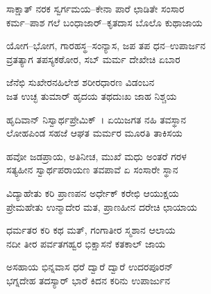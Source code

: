 
\begin{myquote}
ಸಾಕ್ಷಾತ್ ನರಕ ಸ್ವರ್ಗಮಯ–ಕೇನಾ ಪಾರೆ ಛಾಡಿತೇ ಸಂಸಾರ\\ಕರ್ಮ–ಪಾಶ ಗಲೆ ಬಂಧಾಜಾರ್–ಕೃತದಾಸ ಬೊಲೊ ಕುಥಾಜಾಯ
\end{myquote}


\begin{myquote}
ಯೋಗ–ಭೋಗ, ಗಾರಹಸ್ಥ–ಸಂನ್ಯಾಸ, ಜಪ ತಪ ಧನ–ಉಪಾರ್ಜನ\\ವ್ರತತ್ಯಾಗ ತಪಸ್ಯಕಠೋರ, ಸಬ್ ಮರ್ಮ ದೇಖೇಚಿ ಏಬಾರ
\end{myquote}


\begin{myquote}
ಜೆನೆಛಿ ಸುಖೇರನಹಿಲೇಶ ಶರೀರಧಾರಣ ವಿಡಂಬನ\\ಜತ ಉಚ್ಛ ತುಮಾರ್‌ ಹೃದಯ ತಥದುಃಖ ಜಾಹ ನಿಶ್ಚಯ
\end{myquote}


\begin{myquote}
ಹೃದಿವಾನ್ ನಿಸ್ವಾರ್ಥಪ್ರೇಮಿಕ್~। ಏಯಿಜಗತ ನಹಿ ತವಸ್ಥಾನ\\ಲೋಹಪಿಂಡ ಸಹಜೆ ಆಘತ ಮರ್ಮರ ಮೂರತಿ ತಾಕಿಸಯ
\end{myquote}


\begin{myquote}
ಹವೋ ಜಡಪ್ರಾಯ, ಅತಿನೀಚ, ಮುಖೆ ಮಧು ಅಂತರೆ ಗರಳ\\ಸತ್ಯಹೀನ ಸ್ವಾರ್ಥಪರಾಯಣ ತವಪಾವೆ ಏ ಸಂಸಾರೇ ಸ್ಥಾನ
\end{myquote}


\begin{myquote}
ವಿದ್ಯಾಹೇತು ಕರಿ ಪ್ರಾಣಪನ ಅರ್ಧೇಕ್ ಕರೇಛಿ ಆಯುಕ್ಷಯ\\ಪ್ರೇಮಹೇತು ಉನ್ಮಾದೇರ ಮತ, ಪ್ರಾಣಹೀನ ದರೇಚಿ ಛಾಯಾಯ
\end{myquote}


\begin{myquote}
ಧರ್ಮತರ ಕರಿ ಕಥ ಮತ್, ಗಂಗಾತೀರ ಸ್ಮಶಾನ ಆಲಾಯ\\ನದೀ ತೀರ ಪರ್ವತಗಹ್ವರ ಭಿಕ್ಷಾಸನೆ ಕತಕಾಲ್ ಜಾಯ
\end{myquote}


\begin{myquote}
ಅಸಹಾಯ ಭಿನ್ನವಾಸ ಧರೆ ದ್ವಾರೆ ದ್ವಾರೆ ಉದರಪೂರನ್\\ಭಗ್ನದೇಹ ತದಸ್ಯಾರ್‌ ಭಾರೆ ಕಿದನ ಕರಿನು ಉಪಾರ್ಜುನ
\end{myquote}

